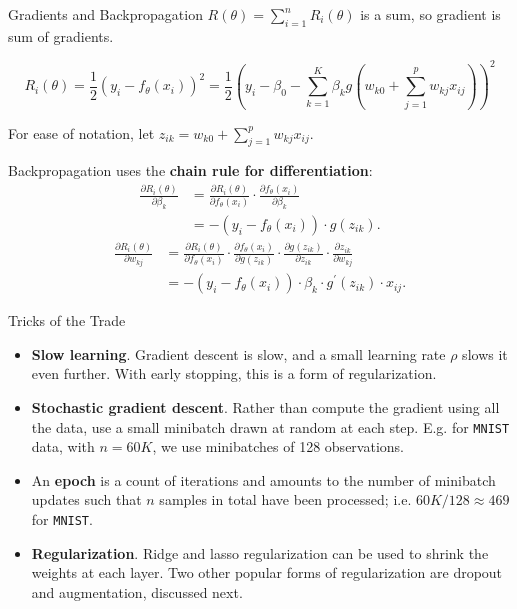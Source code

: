 \documentclass[aspectratio=169, 11pt]{beamer}
\begin{document}
\begin{frame}{Gradients and Backpropagation}
    $R(\theta)=\sum_{i=1}^{n}R_{i}(\theta)$ is a sum, so gradient is sum of gradients.

    \begin{equation*}
    R_{i}(\theta)=\frac{1}{2}(y_{i}-f_{\theta}(x_{i}))^{2}=\frac{1}{2}\left(y_{i}-\beta_{0}-\sum_{k=1}^{K}\beta_{k}g\left(w_{k0}+\sum_{j=1}^{p}w_{kj}x_{ij}\right)\right)^{2}
    \end{equation*}

    For ease of notation, let $z_{ik}=w_{k0}+\sum_{j=1}^{p}w_{kj}x_{ij}.$

    \vspace{1em}
    Backpropagation uses the \textbf{chain rule for differentiation}:
    \begin{align*}
    \frac{\partial R_{i}(\theta)}{\partial\beta_{k}}&=\frac{\partial R_{i}(\theta)}{\partial f_{\theta}(x_{i})}\cdot\frac{\partial f_{\theta}(x_{i})}{\partial\beta_{k}} \\
    &=-(y_{i}-f_{\theta}(x_{i}))\cdot g(z_{ik}).
    \end{align*}
    \begin{align*}
    \frac{\partial R_{i}(\theta)}{\partial w_{kj}}&=\frac{\partial R_{i}(\theta)}{\partial f_{\theta}(x_{i})}\cdot\frac{\partial f_{\theta}(x_{i})}{\partial g(z_{ik})}\cdot\frac{\partial g(z_{ik})}{\partial z_{ik}}\cdot\frac{\partial z_{ik}}{\partial w_{kj}} \\
    &=-(y_{i}-f_{\theta}(x_{i}))\cdot\beta_{k}\cdot g^{\prime}(z_{ik})\cdot x_{ij}.
    \end{align*}
\end{frame}

\begin{frame}{Tricks of the Trade}
    \begin{itemize}
        \item<1-> \textbf{Slow learning}. Gradient descent is slow, and a small learning rate $\rho$ slows it even further. With early stopping, this is a form of regularization.
        \item<2-> \textbf{Stochastic gradient descent}. Rather than compute the gradient using all the data, use a small minibatch drawn at random at each step. E.g. for \texttt{MNIST} data, with $n=60K$, we use minibatches of 128 observations.
        \item<3-> An \textbf{epoch} is a count of iterations and amounts to the number of minibatch updates such that $n$ samples in total have been processed; i.e. $60K/128\approx469$ for \texttt{MNIST}.
        \item<4-> \textbf{Regularization}. Ridge and lasso regularization can be used to shrink the weights at each layer. Two other popular forms of regularization are dropout and augmentation, discussed next.
    \end{itemize}
\end{frame}
\end{document}
